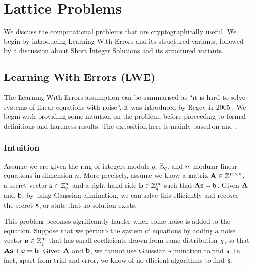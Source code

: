 \section{Lattice Problems}\label{sec:LP}
We discuss the computational problems that are cryptographically useful. We begin by introducing Learning With Errors and its structured variants, followed by a discussion about Short Integer Solutions and its structured variants.

\subsection{Learning With Errors (LWE)}
The Learning With Errors assumption can be summarised as ``it is hard to solve systems of linear equations with noise''. It was introduced by Regev in 2005 \cite{reg05}. We begin with providing some intuition on the problem, before proceeding to formal definitions and hardness results. The exposition here is mainly based on \cite{peikert_dec} and \cite{cryptoeprint:2021/1358}.

\subsubsection{Intuition}
Assume we are given the ring of integers modulo $q$, $\mathbb{Z}_q$, and $m$ modular linear equations in dimension $n$. More precisely, assume we know a matrix $\mathbf{A} \in \mathbb{Z}^{m \times n}$, a secret vector $\mathbf{s} \in \mathbb{Z}_q^{n}$ and a right hand side $\mathbf{b} \in \mathbb{Z}_q^m$ such that $\mathbf{A} \mathbf{s} = \mathbf{b}$. Given $\mathbf{A}$ and $\mathbf{b}$, by using Gaussian elimination, we can solve this efficiently and recover the secret $\mathbf{s}$, or state that no solution exists. 

This problem becomes significantly harder when some noise is added to the equation. Suppose that we perturb the system of equations by adding a noise vector $\mathbf{e} \in \mathbb{Z}_q^m$ that has small coefficients drawn from some distribution $\chi$, so that $\mathbf{A} \mathbf{s} + \mathbf{e} = \mathbf{b}$. Given $\mathbf{A}$ and $\mathbf{b}$, we cannot use Gaussian elimination to find $\mathbf{s}$. In fact, apart from trial and error, we know of no efficient algorithms to find $\mathbf{s}$.

